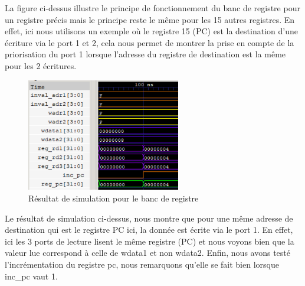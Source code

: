 \documentclass[10pt,a4paper]{article}
\begin{document}
			La figure ci-dessus illustre le principe de fonctionnement du banc de registre pour un registre 
			précis mais le principe reste le même pour les 15 autres registres. En effet, ici nous utilisons un 
			exemple où le registre 15 (PC) est la destination d’une écriture via le port 1 et 2, cela nous 
			permet de montrer la prise en compte de la priorisation du port 1 lorsque l'adresse du registre de 
			destination est la même pour les 2 écritures.
 			
			\begin{figure}[H]															%
				\centering 																%
				\includegraphics[width=0.6\textwidth]{reg_gtkwave.png}					%
				\caption{Résultat de simulation pour le banc de registre}				%
				\label{Fig.main2} 														%
			\end{figure}

			Le résultat de simulation ci-dessus, nous montre que pour une même adresse de destination qui est 
			le registre PC ici, la donnée est écrite via le port 1. En effet, ici les 3 ports de lecture lisent 
			le même registre (PC) et nous voyons bien que la valeur lue correspond à celle de wdata1 et non 
			wdata2. Enfin, nous avons testé l'incrémentation du registre pc, nous remarquons qu'elle se fait 
			bien lorsque inc\_pc vaut 1. 
		
\end{document}
